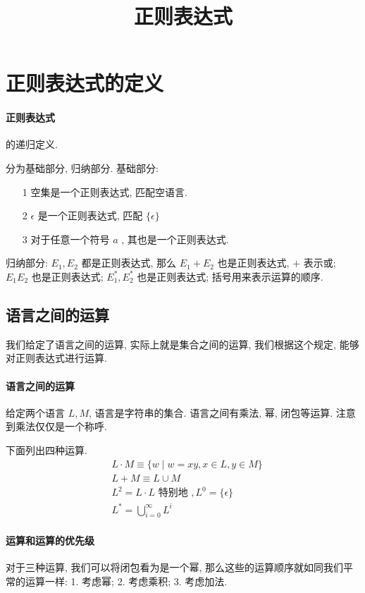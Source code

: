 \documentclass[../main.tex]{subfiles}
\begin{document}
\title{正则表达式}
\tableofcontents

\section{正则表达式的定义}%
\paragraph{正则表达式} 的递归定义. 
\begin{definition}
分为基础部分, 归纳部分. 基础部分:
\begin{itemize}
\item [1] 
空集是一个正则表达式, 匹配空语言. 
\item [2] \(\epsilon\) 是一个正则表达式, 匹配 \(\{ \epsilon \}\)
\item [3] 对于任意一个符号 \(a\) , 其也是一个正则表达式. 
\end{itemize}
归纳部分: \(E_{1}, E_{2}\) 都是正则表达式, 那么 \(E_{1} + E_{2}\) 也是正则表达式,  \(+\) 表示或; \(E_{1} E_{2} \) 也是正则表达式; \(E_{1} ^{*}, E_{2} ^{*}\) 也是正则表达式; 括号用来表示运算的顺序. 
\end{definition}

\subsection{语言之间的运算}
我们给定了语言之间的运算, 实际上就是集合之间的运算, 我们根据这个规定, 能够对正则表达式进行运算. 
\paragraph{语言之间的运算}
给定两个语言 \(L, M\), 语言是字符串的集合. 语言之间有乘法, 幂, 闭包等运算. 注意到乘法仅仅是一个称呼. 
\begin{definition}[运算] 下面列出四种运算. \\ 
\[
\begin{aligned}
& L \cdot M \equiv \{ w \mid w = xy , x \in L , y \in M\} \\
& L + M \equiv L \cup M \\
& L^{2} = L \cdot L \text{ 特别地 }, L ^{0} = \{\epsilon\}\\
& L ^{*} = \bigcup_{i= 0 } ^{\infty} L ^{i}
\end{aligned}
\]
\end{definition}

\paragraph{运算和运算的优先级}
对于三种运算, 我们可以将闭包看为是一个幂, 那么这些的运算顺序就如同我们平常的运算一样: 1. 考虑幂; 2. 考虑乘积; 3. 考虑加法.
\end{document}

